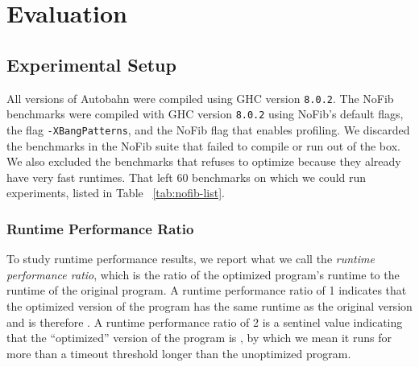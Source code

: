 \chapter{Evaluation} 

\label{Chapter5} %


\section{Experimental Setup}

All versions of Autobahn were compiled using GHC
version \texttt{8.0.2}. The NoFib benchmarks were compiled with
GHC version \texttt{8.0.2} using NoFib's default flags, the flag
\texttt{-XBangPatterns}, and the NoFib flag that enables profiling.
We discarded the benchmarks in the NoFib suite that failed to compile
or run out of the box. We also excluded the benchmarks that \Ao{}
refuses to optimize because they already have very fast runtimes. That
left 60 benchmarks on which we could run experiments, listed in Table ~\ref{tab:nofib-list}.

\subsection{Runtime Performance Ratio}
To study runtime performance results, we report what we call
the \textit{runtime performance ratio}, which is the ratio of the
optimized program's runtime to the runtime of the original program. 
A runtime performance ratio of 1 indicates that
the optimized version of the program has the same runtime as the
original version and is therefore \textit{\unimp{}}.  A runtime
performance ratio of 2 is a sentinel value indicating that the
``optimized'' version of the program is \textit{\nonterm{}}, by which
we mean it runs for more than a timeout threshold longer than the
unoptimized program. 

